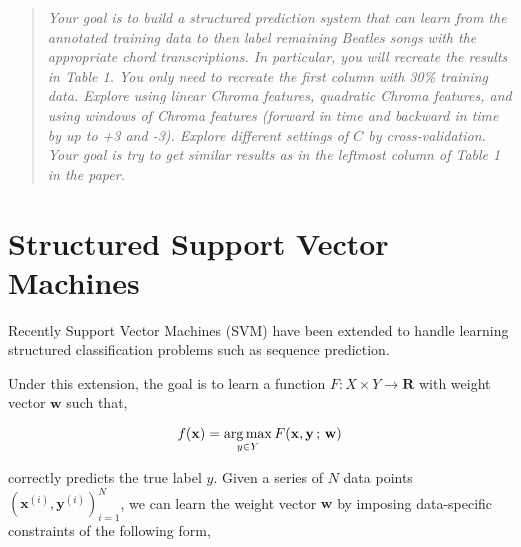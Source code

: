 \newcommand{\proj}[1]{\ensuremath{\operatorname{Project}\paren{{#1}}}}
\newcommand{\Proj}{\operatorname{Project}}

\newcommand{\Regret}{\operatorname{Regret}}






\begin{abstract} \emph{Your goal is to build a structured prediction system that can
learn from the annotated training data to then label remaining Beatles songs
with the appropriate chord transcriptions. In particular, you will recreate the
results in Table 1. You only need to recreate the first column with 30\%
training data.  Explore using linear Chroma features, quadratic Chroma
features, and using windows of Chroma features (forward in time and backward in
time by up to +3 and -3). Explore different settings of $C$ by
cross-validation.  Your goal is try to get similar results as in the leftmost
column of Table 1 in the paper.}  \end{abstract}

\section{Structured Support Vector Machines}
\label{sec:struct-svm}

Recently Support Vector Machines (SVM) have been extended to handle learning
structured classification problems such as sequence prediction. 

Under this
extension, the goal is to learn a function $F : X \times Y \rightarrow
\mathbf{R}$ with weight vector $\mathbf{w}$ such that,

\begin{equation*}
f(\mathbf{x}) = \operatorname*{arg\,max}_{y \in Y}F(\mathbf{x},\mathbf{y}\,;\,\mathbf{w})
\end{equation*}

correctly predicts the true label $y$. Given a series of $N$ data points
$(\mathbf{x}^{(i)}, \mathbf{y}^{(i)})_{i=1}^{N}$, we can learn the weight
vector $\mathbf{w}$ by imposing data-specific constraints of the following
form,

